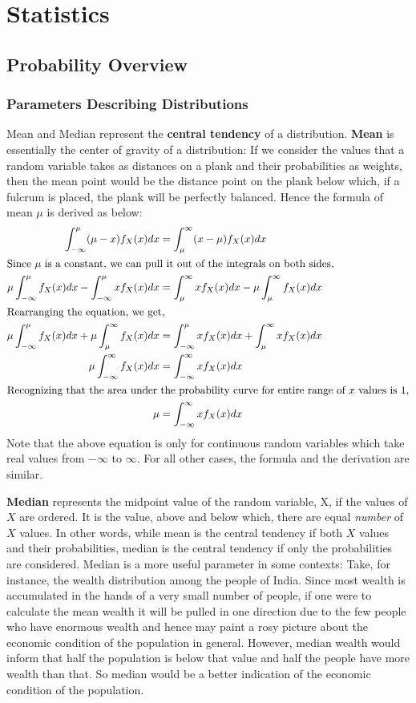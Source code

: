 \chapter{Statistics}

\section {Probability Overview}
\subsection {Parameters Describing Distributions}
Mean and Median represent the \textbf{central tendency} of a distribution. \textbf{Mean} is essentially the center of gravity of a distribution: If we consider the values that a random variable takes as distances on a plank and their probabilities as weights, then the mean point would be the distance point on the plank below which, if a fulcrum is placed, the plank will be perfectly balanced. Hence the formula of mean $\mu$ is derived as below:
	\begin{align*}
		\int_{-\infty}^{\mu} (\mu-x)f_X(x)dx &= \int_{\mu}^{\infty} (x-\mu)f_X(x)dx \\
		\intertext{Since $\mu$ is a constant, we can pull it out of the integrals on both sides,} 
		\mu \int_{-\infty}^{\mu}f_X(x)dx - \int_{-\infty}^{\mu} xf_X(x)dx &= \int_{\mu}^{\infty} xf_X(x)dx - \mu \int_{\mu}^{\infty}f_X(x)dx \\
		\intertext{Rearranging the equation, we get,} 
		\mu \int_{-\infty}^{\mu}f_X(x)dx + \mu \int_{\mu}^{\infty}f_X(x)dx &= \int_{-\infty}^{\mu} xf_X(x)dx + \int_{\mu}^{\infty} xf_X(x)dx \\
		\mu \int_{-\infty}^{\infty}f_X(x)dx &= \int_{-\infty}^{\infty} xf_X(x)dx \\
		\intertext{Recognizing that the area under the probability curve for entire range of $x$ values is $1$,} 
		\mu &=  \int_{-\infty}^{\infty} xf_X(x)dx
	\end{align*}
Note that the above equation is only for continuous random variables which take real values from $-\infty$ to $\infty$. For all other cases, the formula and the derivation are similar. 

\textbf{Median} represents the midpoint value of the random variable, X, if the values of $X$ are ordered. It is the value, above and below which, there are equal \emph{number} of $X$ values. In other words, while mean is the central tendency if both $X$ values and their probabilities, median is the central tendency if only the probabilities are considered. Median is a more useful parameter in some contexts: Take, for instance, the wealth distribution among the people of India. Since most wealth is accumulated in the hands of a very small number of people, if one were to calculate the mean wealth it will be pulled in one direction due to the few people who have enormous wealth and hence may paint a rosy picture about the economic condition of the population in general. However, median wealth would inform that half the population is below that value and half the people have more wealth than that. So median would be a better indication of the economic condition of the population. 

